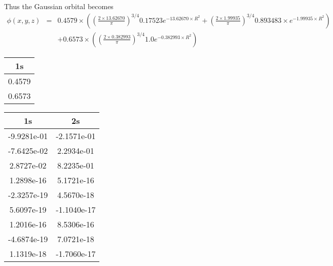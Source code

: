 Thus the Gaussian orbital becomes
\begin{eqnarray*}
\phi\left(x,y,z\right) & = & 0.4579\times\left(\left(\frac{2\times13.62670}{\pi}\right)^{3/4}0.17523e^{-13.62670\times R^{2}}+\left(\frac{2\times1.99935}{\pi}\right)^{3/4}0.893483\times e^{-1.99935\times R^{2}}\right)\\
 &  & +0.6573\times\left(\left(\frac{2\times0.382993}{\pi}\right)^{3/4}1.0e^{-0.382993\times R^{2}}\right)
\end{eqnarray*}


\begin{table}
	\begin{centering}
	\begin{subtable}{1.0\linewidth}
		\begin{centering}
		\begin{tabular}{|c|}
			\hline 
			1s\tabularnewline
			\hline 
			0.4579\tabularnewline
			\hline 
			0.6573\tabularnewline
			\hline 
		\end{tabular}
		\par\end{centering}
	\end{subtable}

	\begin{subtable}{1.0\linewidth}
		\begin{centering}
		\begin{tabular}{|c|c|}
			\hline 
			1s & 2s\tabularnewline
			\hline 
			-9.9281e-01 & -2.1571e-01\tabularnewline
			\hline 
			-7.6425e-02 & 2.2934e-01\tabularnewline
			\hline 
			2.8727e-02 & 8.2235e-01\tabularnewline
			\hline 
			1.2898e-16 & 5.1721e-16\tabularnewline
			\hline 
			-2.3257e-19 & 4.5670e-18\tabularnewline
			\hline 
			5.6097e-19 & -1.1040e-17\tabularnewline
			\hline 
			1.2016e-16  & 8.5306e-16\tabularnewline
			\hline 
			-4.6874e-19 & 7.0721e-18\tabularnewline
			\hline 
			1.1319e-18 & -1.7060e-17\tabularnewline
			\hline 
		\end{tabular}
		\par\end{centering}
	\end{subtable}


\end{centering}
\end{table}
